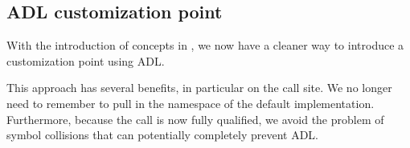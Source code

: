 \subsection{\texorpdfstring{ ADL customization point}{C++20 ADL customization point}}

With the introduction of concepts in , we now have a cleaner way to introduce a customization point using ADL.

This approach has several benefits, in particular on the call site. We no longer need to remember to pull in the namespace of the default implementation. Furthermore, because the call is now fully qualified, we avoid the problem of symbol collisions that can potentially completely prevent ADL.